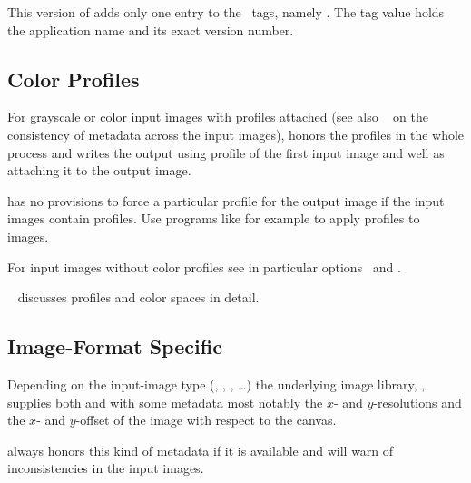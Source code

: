 %
This version of \App{} adds only one entry to the ~tags, namely
.  The tag value holds the application name and its exact
version number.


\subsection{\label{sec:metadata-icc}%
   Color Profiles}

For grayscale or color input images with  profiles attached (see also
\sectionName~ on the consistency of  metadata
across the input images), \App{} honors the profiles in the whole \appisdoing{} process and
writes the output using  profile of the first input image and well as attaching it
to the output image.

\App{} has no provisions to force a particular  profile for the output image if the
input images contain profiles.  Use programs like for example
 to apply profiles to  images.

For input images without color profiles see in particular
options~ and
.

\chapterName~ discusses  profiles and color spaces in
detail.


\subsection[Format Specific]{\label{sec:metadata-specific}%
  Image-Format Specific}

%
%
%
%
%
%
Depending on the input-image type (, , , \dots) the
underlying image library, , supplies both \App{} and
\OtherApp{} with some metadata most notably the $x$- and $y$-resolutions and the $x$- and
$y$-offset of the image with respect to the canvas.

\App{} always honors this kind of metadata if it is available and will warn of inconsistencies
in the input images.



